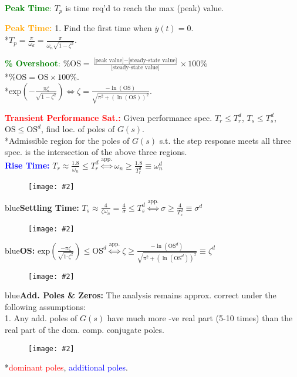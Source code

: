 \documentclass[5pt]{extarticle} %
\newcommand{\customFigure}[3][]{%
    \vspace{-1.5em}
    \begin{figure}[H]
        \centering
        \texttt{[image: \#2]}
    \end{figure}
    \vspace{-1.5em}
}
\begin{document}
\begin{paracol}{3}
{    \textcolor{green}{\textbf{Peak Time}:} $T_p$ is time req'd to reach the max (peak) value.

    \textcolor{orange}{\textbf{Peak Time:}} 1. Find the first time when $\overset{\cdot}{y}(t) = 0$. \\
    *$\boxed{T_p = \frac{\pi}{\omega_d} = \frac{\pi}{\omega_n \sqrt{1 - \zeta^2}}}$.

    \textcolor{green}{\textbf{\% Overshoot}:} $\% \text{OS} = \frac{\text{[peak value]} - \text{[steady-state value]}}{\text{[steady-state value]}} \times 100\%$ \\
    *$\text{\% OS} = \text{OS} \times 100 \%$. \\
    *$\boxed{\text{exp}\left(-\frac{\pi \zeta}{\sqrt{1-\zeta^2}}\right) \iff \zeta = \frac{-\ln(\text{OS})}{\sqrt{\pi^2 + (\ln(\text{OS}))^2}}}$.

    \switchcolumn

    \textcolor{red}{\textbf{Transient Performance Sat.:}} Given performance spec. $T_r \leq T_r^d$, $T_s \leq T_s^d$, $\text{OS} \leq \text{OS}^d$, find loc. of poles of $G(s)$. \\
    *Admissible region for the poles of $G(s)$ s.t. the step response meets all three spec. is the intersection of the above three regions. \\
    \textcolor{blue}{\textbf{Rise Time:}} $T_r \approx \frac{1.8}{\omega_n} \leq T_r^d \overset{\text{app.}}{\iff} \omega_n \geq \frac{1.8}{T_r^d} \equiv \omega_n^d$ 

    \customFigure[0.1]{../Images/L12_0.png}

    \textcolor{blue}{\textbf{Settling Time:}} $T_s \approx \frac{4}{\zeta \omega_n} = \frac{4}{\sigma} \leq T_s^d \overset{\text{app.}}{\iff} \sigma \geq \frac{4}{T_s^d} \equiv \sigma^d$ 
    \customFigure[0.1]{../Images/L12_1.png}

    \textcolor{blue}{\textbf{OS:}} $\text{exp}\left(\frac{-\pi \zeta}{\sqrt{1\text{-}\zeta^2}}\right) \leq \text{OS}^d \overset{\text{app.}}{\iff} \zeta \geq \frac{-\ln(\text{OS}^d)}{\sqrt{\pi^2 + (\ln(\text{OS}^d))^2}} \equiv \zeta^d$ 
    \customFigure[0.1]{../Images/L12_2.png}

    \textcolor{blue}{\textbf{Add. Poles \& Zeros:}} The analysis remains approx. correct under the following assumptions: \\
    1. Any add. poles of $G(s)$ have much more -ve real part (5-10 times) than the real part of the dom. comp. conjugate poles. 
    \customFigure[0.2]{../Images/L12_3.png} \\
    *\textcolor{red}{dominant poles}, \textcolor{blue}{additional poles}.

}
\end{paracol}
\end{document}
